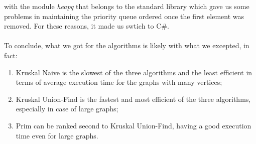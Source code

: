 with the module \textit{heapq} that belongs to the standard library which gave us some problems in 
maintaining the priority queue ordered once the first element was removed. For these reasons, it made us 
swtich to C\#. \\
\\
\noindent
To conclude, what we got for the algorithms is likely with what we excepted, in fact:
\begin{enumerate}
    \item Kruskal Naive is the slowest of the three algorithms and the least efficient in terms of average 
    execution time for the graphs with many vertices;
    \item Kruskal Union-Find is the fastest and most efficient of the three algorithms, especially in case of large graphs;
    \item Prim can be ranked second to Kruskal Union-Find, having a good execution time even for large graphs.
\end{enumerate} 